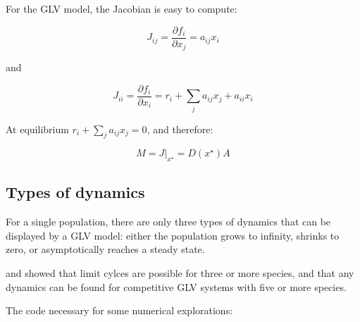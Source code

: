 \documentclass[
]{book}
\begin{document}
For the GLV model, the Jacobian is easy to compute:

\[
J_{ij} = \frac{\partial f_i}{\partial x_j} = a_{ij} x_i
\]

and

\[
J_{ii} = \frac{\partial f_i}{\partial x_i} = r_i + \sum_j a_{ij} x_j + a_{ii} x_i
\]

At equilibrium \(r_i + \sum_j a_{ij} x_j = 0\), and therefore:

\[
M = \left. {J} \right|_{ {x}^\star} = D(x^\star)A
\]

\hypertarget{types-of-dynamics}{%
\subsection{Types of dynamics}\label{types-of-dynamics}}

For a single population, there are only three types of dynamics that can be displayed by a GLV model: either the population grows to infinity, shrinks to zero, or asymptotically reaches a steady state.

\citet{smale1976differential} and \citet{hirsch1982systems} showed that limit cylces are possible for three or more species, and that any dynamics can be found for competitive GLV systems with five or more species.

The code necessary for some numerical explorations:
\end{document}
